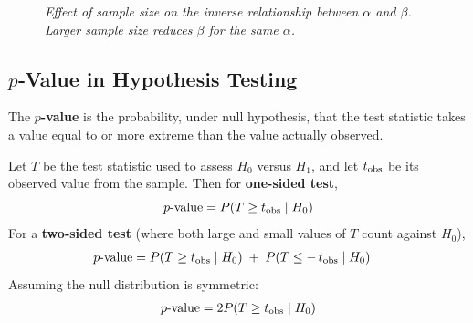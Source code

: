 \documentclass[twoside]{book}
\begin{document}
\begin{figure}[H]
	\centering
	\caption{\textit{Effect of sample size on the inverse relationship between \(\alpha\) and \(\beta\). Larger sample size reduces \(\beta\) for the same \(\alpha\).}}
	\label{fig:alpha_beta_sample_size}
\end{figure}



\subsection{$p$‐Value in Hypothesis Testing}

\begin{textbox}
The $p$\textbf{-value} is the probability, under null hypothesis, that the test statistic takes a value equal to or more extreme than the value actually observed.
\end{textbox}

Let $T$ be the test statistic used to assess $H_0$ versus $H_1$, and let $t_{\rm obs}$ be its observed value from the sample. Then for \textbf{one-sided test},
\[
p\text{-value} = P(T \ge t_{\rm obs}\mid H_0)
\]
For a \textbf{two‐sided test} (where both large and small values of $T$ count against $H_0$),
\begin{align*}
p\text{-value} &=
P(T \ge t_{\rm obs}\mid H_0)
\;+\;
P(T \le -\,t_{\rm obs}\mid H_0)
\end{align*}
Assuming the null distribution is symmetric:
\begin{align*}
p\text{-value} =2P(T \ge t_{\rm obs}\mid H_0)
\end{align*}
\end{document}
